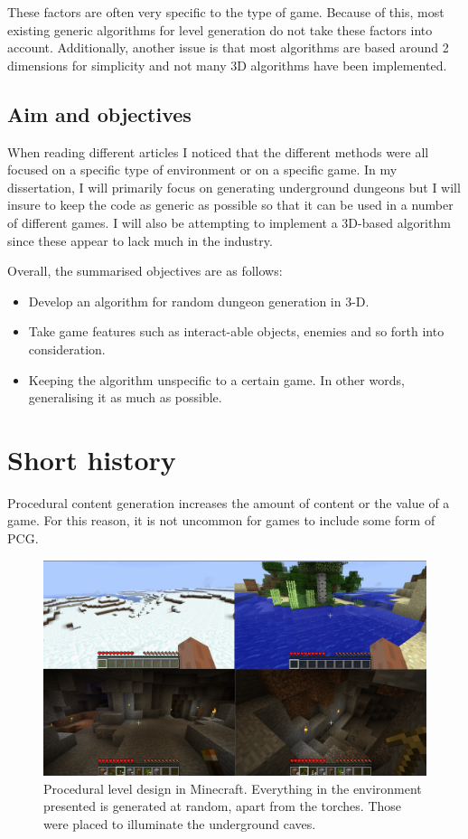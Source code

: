 \documentclass{ueacmpstyle}
\begin{document}
These factors are often very specific to the type of game. Because of this, most existing generic algorithms for level generation do not take these factors into account. Additionally, another issue is that most algorithms are based around 2 dimensions for simplicity and not many 3D algorithms have been implemented.

\subsection{Aim and objectives}
When reading different articles I noticed that the different methods were all focused on a specific type of environment or on a specific game. In my dissertation, I will primarily focus on generating underground dungeons but I will insure to keep the code as generic as possible so that it can be used in a number of different games. I will also be attempting to implement a 3D-based algorithm since these appear to lack much in the industry.

Overall, the summarised objectives are as follows:
\begin{itemize}
\item Develop an algorithm for random dungeon generation in 3-D.
\item Take game features such as interact-able objects, enemies and so forth into consideration.
\item Keeping the algorithm unspecific to a certain game. In other words, generalising it as much as possible.
\end{itemize}

\section{Short history}
Procedural content generation increases the amount of content or the value of a game. For this reason, it is not uncommon for games to include some form of PCG.

\begin{figure}[h!]
  \centering
    \includegraphics[width=1.0\textwidth]{images/minecraft.png}
\caption{Procedural level design in Minecraft. Everything in the environment presented is generated at random, apart from the torches. Those were placed to illuminate the underground caves.}
\end{figure}
\end{document}
